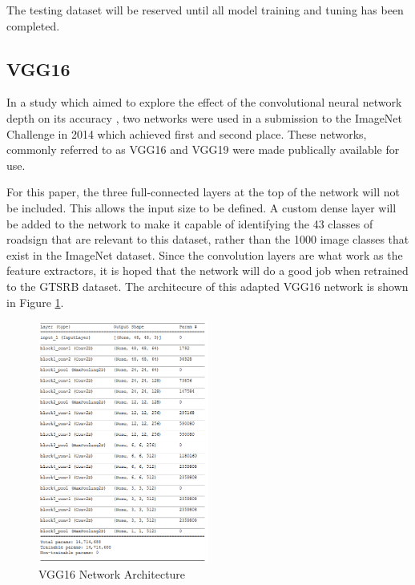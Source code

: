 \documentclass[a4paper,11pt]{article}
\begin{document}
The testing dataset will be reserved until all model training and tuning has been completed.


\subsection{VGG16}

In a study which aimed to explore the effect of the convolutional neural network depth on its accuracy \cite{Simonyan2015}, two networks were used in a submission to the ImageNet Challenge in 2014 which achieved first and second place. These networks, commonly referred to as VGG16 and VGG19 were made publically available for use. 

For this paper, the three full-connected layers at the top of the network will not be included. This allows the input size to be defined. A custom dense layer will be added to the network to make it capable of identifying the 43 classes of roadsign that are relevant to this dataset, rather than the 1000 image classes that exist in the ImageNet dataset. Since the convolution layers are what work as the feature extractors, it is hoped that the network will do a good job when retrained to the GTSRB dataset. The architecure of this adapted VGG16 network is shown in Figure \ref{fig:myfig}. 

\begin{figure}[!ht]
	\begin{center}
		\includegraphics[width=0.5\textwidth]{network_architecture.png}
	\end{center}
	\vspace{-20pt}
	\caption{VGG16 Network Architecture}\label{fig:myfig}
	\vspace{-10pt}
\end{figure}
\end{document}
